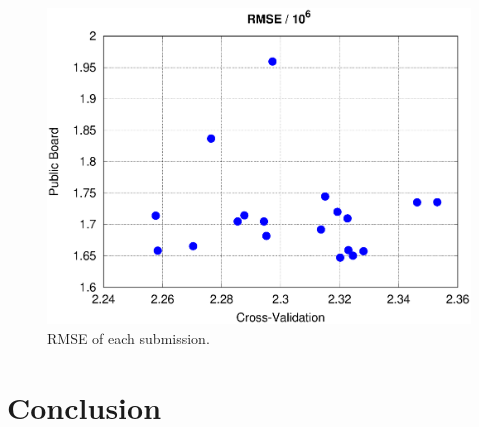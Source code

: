 \documentclass[10pt, oneside]{article}   	%
\begin{document}
\begin{figure}[htbp] %
   \centering
   \includegraphics[width=5in]{figs/scores.eps} 
   \caption{RMSE of each submission.}
   \label{fig:cv_lb_error}
\end{figure}


\section{Conclusion}
\end{document}
